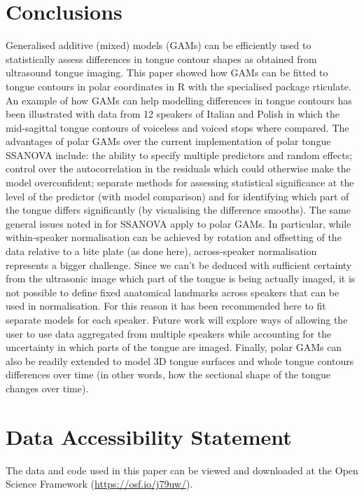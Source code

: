 \documentclass[
  11pt,
]{article}
\begin{document}
\hypertarget{conclusions}{%
\section{Conclusions}\label{conclusions}}

Generalised additive (mixed) models (GAMs) can be efficiently used to
statistically assess differences in tongue contour shapes as obtained
from ultrasound tongue imaging. This paper showed how GAMs can be fitted
to tongue contours in polar coordinates in R with the specialised
package rticulate. An example of how GAMs can help modelling differences
in tongue contours has been illustrated with data from 12 speakers of
Italian and Polish in which the mid-sagittal tongue contours of
voiceless and voiced stops where compared. The advantages of polar GAMs
over the current implementation of polar tongue SSANOVA include: the
ability to specify multiple predictors and random effects; control over
the autocorrelation in the residuals which could otherwise make the
model overconfident; separate methods for assessing statistical
significance at the level of the predictor (with model comparison) and
for identifying which part of the tongue differs significantly (by
visualising the difference smooths). The same general issues noted in
\citet{davidson2006} for SSANOVA apply to polar GAMs. In particular,
while within-speaker normalisation can be achieved by rotation and
offsetting of the data relative to a bite plate (as done here),
across-speaker normalisation represents a bigger challenge. Since we
can't be deduced with sufficient certainty from the ultrasonic image
which part of the tongue is being actually imaged, it is not possible to
define fixed anatomical landmarks across speakers that can be used in
normalisation. For this reason it has been recommended here to fit
separate models for each speaker. Future work will explore ways of
allowing the user to use data aggregated from multiple speakers while
accounting for the uncertainty in which parts of the tongue are imaged.
Finally, polar GAMs can also be readily extended to model 3D tongue
surfaces and whole tongue contours differences over time (in other
words, how the sectional shape of the tongue changes over time).

\hypertarget{data-accessibility-statement}{%
\section{Data Accessibility
Statement}\label{data-accessibility-statement}}

The data and code used in this paper can be viewed and downloaded at the
Open Science Framework (\url{https://osf.io/j79uw/}).

  
\end{document}
